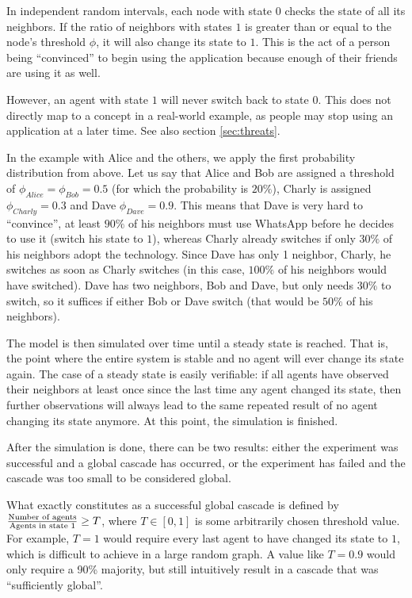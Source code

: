 \documentclass{sig-alternate-05-2015}
\begin{document}
In independent random intervals, each node with state $0$ checks the state of all its neighbors. If the ratio of neighbors with states $1$ is greater than or equal to the node's threshold $\phi$, it will also change its state to $1$. This is the act of a person being ``convinced'' to begin using the application because enough of their friends are using it as well.

However, an agent with state $1$ will never switch back to state $0$. This does not directly map to a concept in a real-world example, as people may stop using an application at a later time. See also section \ref{sec:threats}.

In the example with Alice and the others, we apply the first probability distribution from above. Let us say that Alice and Bob are assigned a threshold of $\phi_{Alice} = \phi_{Bob} = 0.5$ (for which the probability is $20\%$), Charly is assigned $\phi_{Charly} = 0.3$ and Dave $\phi_{Dave} = 0.9$. This means that Dave is very hard to ``convince'', at least $90\%$ of his neighbors must use WhatsApp before he decides to use it (switch his state to $1$), whereas Charly already switches if only $30\%$ of his neighbors adopt the technology. Since Dave has only 1 neighbor, Charly, he switches as soon as Charly switches (in this case, $100\%$ of his neighbors would have switched). Dave has two neighbors, Bob and Dave, but only needs $30\%$ to switch, so it suffices if either Bob or Dave switch (that would be $50\%$ of his neighbors).

The model is then simulated over time until a steady state is reached. That is, the point where the entire system is stable and no agent will ever change its state again. The case of a steady state is easily verifiable: if all agents have observed their neighbors at least once since the last time any agent changed its state, then further observations will always lead to the same repeated result of no agent changing its state anymore. At this point, the simulation is finished.

After the simulation is done, there can be two results: either the experiment was successful and a global cascade has occurred, or the experiment has failed and the cascade was too small to be considered global.

What exactly constitutes as a successful global cascade is defined by $\frac{\textmd{Number of agents}}{\textmd{Agents in state } 1} \geq T$, where $T \in [0, 1]$ is some arbitrarily chosen threshold value. For example, $T = 1$ would require every last agent to have changed its state to $1$, which is difficult to achieve in a large random graph. A value like $T = 0.9$ would only require a 90\% majority, but still intuitively result in a cascade that was ``sufficiently global''.
\end{document}
